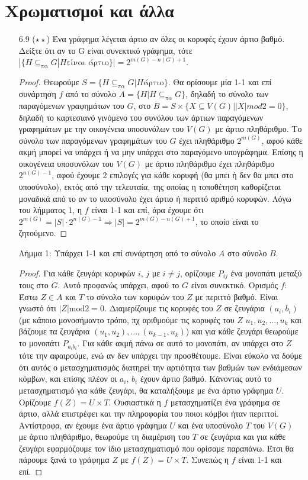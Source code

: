\documentclass[a4paper, oneside, 11pt]{article}
\begin{document}
\section{Χρωματισμοί και άλλα}
\begin{enumerate}

\item[6.9 ($\star\star$)]
   Ένα γράφημα λέγεται άρτιο αν όλες οι κορυφές έχουν άρτιο βαθμό. Δείξτε ότι αν το G είναι συνεκτικό γράφημα, τότε 
   $|\{H\subseteq_{\text{πα}} G | H \text{είναι άρτιο}\}| = 2^{m(G)-n(G)+1}$.

   \begin{proof}
Θεωρούμε $S = \{H\subseteq_{\pi \alpha} G | H \text{άρτιο}\}$.
     Θα ορίσουμε μία 1-1 και επί συνάρτηση $f$ από το σύνολο 
$A = \{H | H\subseteq_{\pi\alpha} G\}$, δηλαδή το σύνολο των παραγόμενων γραφημάτων 
του $G$, στο $B = S\times \{X\subseteq V(G) | |X| mod 2 = 0\}$, 
δηλαδή το καρτεσιανό γινόμενο του συνόλου των άρτιων παραγόμενων γραφημάτων 
με την οικογένεια υποσυνόλων του $V(G)$ με άρτιο πληθάριθμο. Το σύνολο των 
παραγόμενων γραφημάτων του $G$ έχει πληθάριθμο $2^{m(G)}$, αφού κάθε ακμή 
μπορεί να υπάρχει ή να μην υπάρχει στο παραγόμενο υπογράφημα. 
Επίσης η οικογένεια υποσυνόλων του $V(G)$ με άρτιο πληθάριθμο έχει πληθάριθμο 
$2^{n(G)-1}$, αφού έχουμε 2 επιλογές για κάθε κορυφή (θα μπει ή δεν θα μπει 
στο υποσύνολο), εκτός από την τελευταία, της οποίας η τοποθέτηση καθορίζεται 
μοναδικά από το αν το υποσύνολο έχει άρτιο ή περιττό αριθμό κορυφών. Λόγω 
του λήμματος 1, η $f$ είναι 1-1 και επί, άρα έχουμε ότι 
$2^{m(G)} = |S| \cdot 2^{n(G)-1} \Rightarrow |S| = 2^{m(G)-n(G)+1}$, το οποίο 
είναι το ζητούμενο.
   \end{proof}


Λήμμα 1: Υπάρχει 1-1 και επί συνάρτηση από το σύνολο $A$ στο σύνολο $B$.
\begin{proof}
Για κάθε ζευγάρι κορυφών $i$, $j$ με $i\neq j$, ορίζουμε $P_{ij}$ ένα μονοπάτι μεταξύ τους στο $G$. Αυτό προφανώς υπάρχει, αφού το $G$ είναι συνεκτικό.
Ορισμός $f$: Έστω $Z\in A$ και $T$ το σύνολο των κορυφών του $Z$ με περιττό βαθμό. Είναι γνωστό ότι $|Z|\text{mod} 2=0$. Διαμερίζουμε τις κορυφές του $Z$ σε ζευγάρια
$(a_i, b_i)$ (με κάποιο μονοσήμαντο τρόπο, πχ αριθμούμε τις κορυφές του $Z$ $u_1,u_2,...,u_k$ και βάζουμε τα ζευγάρια $(u_1,u_2), ..., (u_{k-1},u_k)$)
και για κάθε ζευγάρι θεωρούμε το μονοπάτι $P_{a_i b_i}$. Για κάθε ακμή πάνω σε αυτό το μονοπάτι, αν υπάρχει στο $Z$ τότε την αφαιρούμε, ενώ αν δεν
υπάρχει την προσθέτουμε. Είναι εύκολο να δούμε ότι αυτός ο μετασχηματισμός διατηρεί την αρτιότητα των βαθμών των ενδιάμεσων κόμβων, και επίσης πλέον οι $a_i$, $b_i$
έχουν άρτιο βαθμό. Κάνοντας αυτό το μετασχηματισμό για κάθε ζευγάρι, θα καταλήξουμε με ένα άρτιο γράφημα $U$. Ορίζουμε $f(Z)=U\times T$. Ουσιαστικά η $f$ μετασχηματίζει ένα
γράφημα σε άρτιο, αλλά επιστρέφει και την πληροφορία του ποιοι κόμβοι ήταν περιττοί. Αντίστροφα, αν έχουμε ένα άρτιο γράφημα $U$ και ένα υποσύνολο $T$ του $V(G)$ με άρτιο πληθάριθμο,
θεωρούμε τη διαμέριση του $T$ σε ζευγάρια και για κάθε ζευγάρι εφαρμόζουμε τον ίδιο μετασχηματισμό που ορίσαμε παραπάνω. Έτσι θα πάρουμε ξανά το γράφημα $Z$ με $f(Z)=U\times T$.
Συνεπώς η $f$ είναι 1-1 και επί.
\end{proof}


\end{enumerate}
\end{document}
